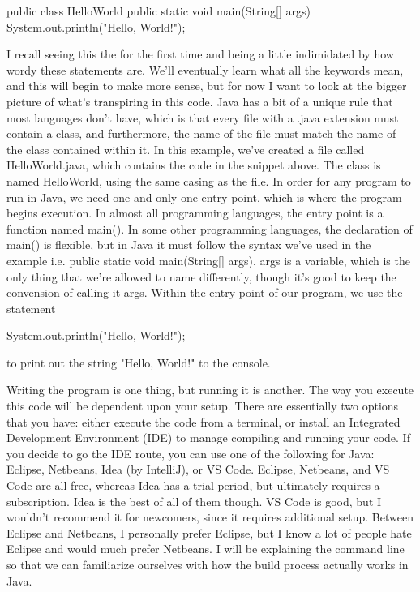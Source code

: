 \documentclass{article}
\begin{document}
\begin{jlst}
public class HelloWorld {
    public static void main(String[] args) {
        System.out.println("Hello, World!");
    }
}
\end{jlst}

I recall seeing this the for the first time and being a little indimidated by how wordy these statements are.
We’ll eventually learn what all the keywords mean, and this will begin to make more sense, but for now I want
to look at the bigger picture of what’s transpiring in this code. Java has a bit of a unique rule that most
languages don’t have, which is that every file with a .java extension must contain a class, and furthermore,
the name of the file must match the name of the class contained within it. In this example, we’ve created a
file called HelloWorld.java, which contains the code in the snippet above. The class is named HelloWorld,
using the same casing as the file. In order for any program to run in Java, we need one and only one entry
point, which is where the program begins execution. In almost all programming languages, the entry point is a
function named main(). In some other programming languages, the declaration of main() is flexible, but in Java
it must follow the syntax we’ve used in the example i.e. public static void main(String[] args). args is a
variable, which is the only thing that we’re allowed to name differently, though it’s good to keep the
convension of calling it args. Within the entry point of our program, we use the statement

\begin{jlst}
System.out.println("Hello, World!");
\end{jlst}

to print out the string "Hello, World!" to the console.

Writing the program is one thing, but running it is another. The way you execute this code will be dependent
upon your setup. There are essentially two options that you have: either execute the code from a terminal, or
install an Integrated Development Environment (IDE) to manage compiling and running your code. If you decide to
go the IDE route, you can use one of the following for Java: Eclipse, Netbeans, Idea (by IntelliJ), or VS Code.
Eclipse, Netbeans, and VS Code are all free, whereas Idea has a trial period, but ultimately requires a
subscription. Idea is the best of all of them though. VS Code is good, but I wouldn’t recommend it for
newcomers, since it requires additional setup. Between Eclipse and Netbeans, I personally prefer Eclipse, but I
know a lot of people hate Eclipse and would much prefer Netbeans. I will be explaining the command line so
that we can familiarize ourselves with how the build process actually works in Java.
\end{document}
